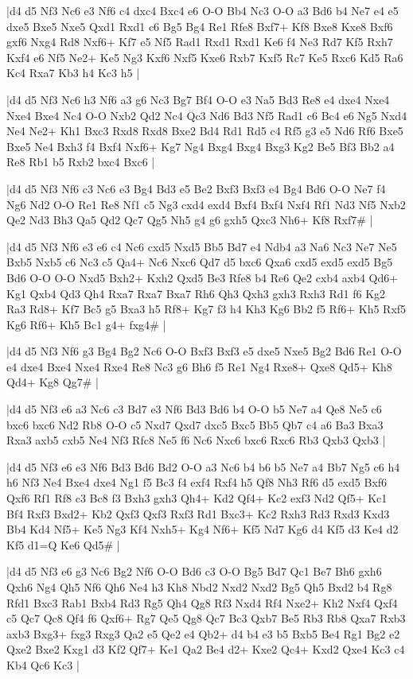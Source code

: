 \whitename{}
\blackname{}
\makegametitle
|d4 d5 Nf3 Nc6 e3 Nf6 c4 dxc4 Bxc4 e6 O-O Bb4 Nc3 O-O a3 Bd6 b4 Ne7 e4 e5 dxe5 Bxe5 Nxe5 Qxd1 Rxd1 c6 Bg5 Bg4 Re1 Rfe8 Bxf7+ Kf8 Bxe8 Kxe8 Bxf6 gxf6 Nxg4 Rd8 Nxf6+ Kf7 e5 Nf5 Rad1 Rxd1 Rxd1 Ke6 f4 Ne3 Rd7 Kf5 Rxh7 Kxf4 e6 Nf5 Ne2+ Ke5 Ng3 Kxf6 Nxf5 Kxe6 Rxb7 Kxf5 Rc7 Ke5 Rxc6 Kd5 Ra6 Kc4 Rxa7 Kb3 h4 Kc3 h5  |

\whitename{}
\blackname{}
\makegametitle
|d4 d5 Nf3 Nc6 h3 Nf6 a3 g6 Nc3 Bg7 Bf4 O-O e3 Na5 Bd3 Re8 e4 dxe4 Nxe4 Nxe4 Bxe4 Nc4 O-O Nxb2 Qd2 Nc4 Qc3 Nd6 Bd3 Nf5 Rad1 c6 Bc4 e6 Ng5 Nxd4 Ne4 Ne2+ Kh1 Bxc3 Rxd8 Rxd8 Bxe2 Bd4 Rd1 Rd5 c4 Rf5 g3 e5 Nd6 Rf6 Bxe5 Bxe5 Ne4 Bxh3 f4 Bxf4 Nxf6+ Kg7 Ng4 Bxg4 Bxg4 Bxg3 Kg2 Be5 Bf3 Bb2 a4 Re8 Rb1 b5 Rxb2 bxc4 Bxc6  |

\whitename{}
\blackname{}
\makegametitle
|d4 d5 Nf3 Nf6 c3 Nc6 e3 Bg4 Bd3 e5 Be2 Bxf3 Bxf3 e4 Bg4 Bd6 O-O Ne7 f4 Ng6 Nd2 O-O Re1 Re8 Nf1 c5 Ng3 cxd4 exd4 Bxf4 Bxf4 Nxf4 Rf1 Nd3 Nf5 Nxb2 Qe2 Nd3 Bh3 Qa5 Qd2 Qc7 Qg5 Nh5 g4 g6 gxh5 Qxc3 Nh6+ Kf8 Rxf7\#  |

\whitename{}
\blackname{}
\makegametitle
|d4 d5 Nf3 Nf6 e3 e6 c4 Nc6 cxd5 Nxd5 Bb5 Bd7 e4 Ndb4 a3 Na6 Nc3 Ne7 Ne5 Bxb5 Nxb5 c6 Nc3 c5 Qa4+ Nc6 Nxc6 Qd7 d5 bxc6 Qxa6 cxd5 exd5 exd5 Bg5 Bd6 O-O O-O Nxd5 Bxh2+ Kxh2 Qxd5 Be3 Rfe8 b4 Re6 Qe2 cxb4 axb4 Qd6+ Kg1 Qxb4 Qd3 Qh4 Rxa7 Rxa7 Bxa7 Rh6 Qh3 Qxh3 gxh3 Rxh3 Rd1 f6 Kg2 Ra3 Rd8+ Kf7 Bc5 g5 Bxa3 h5 Rf8+ Kg7 f3 h4 Kh3 Kg6 Bb2 f5 Rf6+ Kh5 Rxf5 Kg6 Rf6+ Kh5 Bc1 g4+ fxg4\#  |

\whitename{}
\blackname{}
\makegametitle
|d4 d5 Nf3 Nf6 g3 Bg4 Bg2 Nc6 O-O Bxf3 Bxf3 e5 dxe5 Nxe5 Bg2 Bd6 Re1 O-O e4 dxe4 Bxe4 Nxe4 Rxe4 Re8 Nc3 g6 Bh6 f5 Re1 Ng4 Rxe8+ Qxe8 Qd5+ Kh8 Qd4+ Kg8 Qg7\#  |

\whitename{}
\blackname{}
\makegametitle
|d4 d5 Nf3 e6 a3 Nc6 c3 Bd7 e3 Nf6 Bd3 Bd6 b4 O-O b5 Ne7 a4 Qe8 Ne5 c6 bxc6 bxc6 Nd2 Rb8 O-O c5 Nxd7 Qxd7 dxc5 Bxc5 Bb5 Qb7 c4 a6 Ba3 Bxa3 Rxa3 axb5 cxb5 Ne4 Nf3 Rfc8 Ne5 f6 Nc6 Nxc6 bxc6 Rxc6 Rb3 Qxb3 Qxb3  |

\whitename{}
\blackname{}
\makegametitle
|d4 d5 Nf3 e6 e3 Nf6 Bd3 Bd6 Bd2 O-O a3 Nc6 b4 b6 b5 Ne7 a4 Bb7 Ng5 c6 h4 h6 Nf3 Ne4 Bxe4 dxe4 Ng1 f5 Bc3 f4 exf4 Rxf4 h5 Qf8 Nh3 Rf6 d5 exd5 Bxf6 Qxf6 Rf1 Rf8 c3 Bc8 f3 Bxh3 gxh3 Qh4+ Kd2 Qf4+ Kc2 exf3 Nd2 Qf5+ Kc1 Bf4 Rxf3 Bxd2+ Kb2 Qxf3 Qxf3 Rxf3 Rd1 Bxc3+ Kc2 Rxh3 Rd3 Rxd3 Kxd3 Bb4 Kd4 Nf5+ Ke5 Ng3 Kf4 Nxh5+ Kg4 Nf6+ Kf5 Nd7 Kg6 d4 Kf5 d3 Ke4 d2 Kf5 d1=Q Ke6 Qd5\#  |

\whitename{}
\blackname{}
\makegametitle
|d4 d5 Nf3 e6 g3 Nc6 Bg2 Nf6 O-O Bd6 c3 O-O Bg5 Bd7 Qc1 Be7 Bh6 gxh6 Qxh6 Ng4 Qh5 Nf6 Qh6 Ne4 h3 Kh8 Nbd2 Nxd2 Nxd2 Bg5 Qh5 Bxd2 b4 Rg8 Rfd1 Bxc3 Rab1 Bxb4 Rd3 Rg5 Qh4 Qg8 Rf3 Nxd4 Rf4 Nxe2+ Kh2 Nxf4 Qxf4 c5 Qc7 Qc8 Qf4 f6 Qxf6+ Rg7 Qe5 Qg8 Qc7 Bc3 Qxb7 Be5 Rb3 Rb8 Qxa7 Rxb3 axb3 Bxg3+ fxg3 Rxg3 Qa2 e5 Qe2 e4 Qb2+ d4 b4 e3 b5 Bxb5 Be4 Rg1 Bg2 e2 Qxe2 Bxe2 Kxg1 d3 Kf2 Qf7+ Ke1 Qa2 Be4 d2+ Kxe2 Qc4+ Kxd2 Qxe4 Kc3 c4 Kb4 Qc6 Kc3  |

